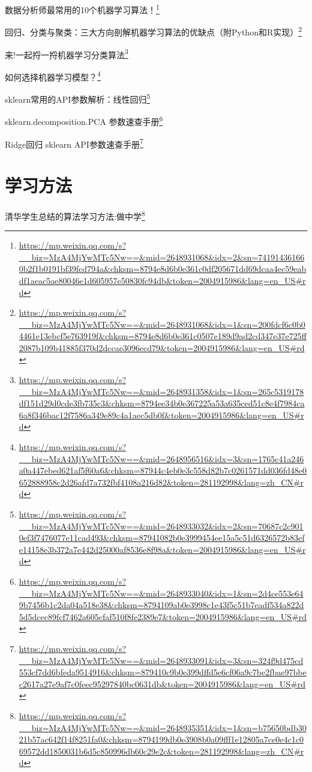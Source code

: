 \documentclass[]{ctexbook}
\renewcommand{\href}[2]{#2\footnote{\url{#1}}}
\begin{document}
\href{https://mp.weixin.qq.com/s?__biz=MzA4MjYwMTc5Nw==\&mid=2648931068\&idx=2\&sn=741914361660b2f1b0191bf39fcd794a\&chksm=8794e8d6b0e361c0df205671dd69dcaa4ec59eabdf1aeac5ae80046e1d605957e50830fc94db\&token=2004915986\&lang=en_US\#rd}{数据分析师最常用的10个机器学习算法！}

\href{https://mp.weixin.qq.com/s?__biz=MzA4MjYwMTc5Nw==\&mid=2648931068\&idx=1\&sn=200fdcf6c0b04461e13ebcf5e763919f\&chksm=8794e8d6b0e361c0507e189d9ad2cd347e37e725ff2087b109b41885f370d2dccae3096ecd79\&token=2004915986\&lang=en_US\#rd}{回归、分类与聚类：三大方向剖解机器学习算法的优缺点（附Python和R实现）}

\href{https://mp.weixin.qq.com/s?__biz=MzA4MjYwMTc5Nw==\&mid=2648931358\&idx=1\&sn=265c5319178df151d29d0cde3fb735c3\&chksm=8794ee34b0e367225a53a635ced51c8e4f7984ca6a8f346bac12f7586a349e89c4a1aec5db0f\&token=2004915986\&lang=en_US\#rd}{来!一起捋一捋机器学习分类算法}

\href{https://mp.weixin.qq.com/s?__biz=MzA4MjYwMTc5Nw==\&mid=2648956516\&idx=3\&sn=1765c41a246a0a447ebed621af5f60a6\&chksm=87944c4eb0e3c558d82b7c0261571dd036fd48e0652888958c2d26afd7a732fbf4108a216d82\&token=281192998\&lang=zh_CN\#rd}{如何选择机器学习模型？}

\href{https://mp.weixin.qq.com/s?__biz=MzA4MjYwMTc5Nw==\&mid=2648933032\&idx=2\&sn=70687c2c9010ef3f7476077e11cad493\&chksm=87941082b0e3999454ee15a5c51d6326572b83efe14158e3b372a7e442d25000af8536e8f98a\&token=2004915986\&lang=en_US\#rd}{sklearn常用的API参数解析：线性回归}

\href{https://mp.weixin.qq.com/s?__biz=MzA4MjYwMTc5Nw==\&mid=2648933040\&idx=1\&sn=2d4ce553e649b7456b1c2da04a518e38\&chksm=8794109ab0e3998c1e43f5c51b7eadf534a822d5d5dcec89fcf7462a605cfaf510f8fe2389e7\&token=2004915986\&lang=en_US\#rd}{sklearn.decomposition.PCA 参数速查手册}

\href{https://mp.weixin.qq.com/s?__biz=MzA4MjYwMTc5Nw==\&mid=2648933091\&idx=3\&sn=324f9d475cd553cf7dd6bfeda9514916\&chksm=879410c9b0e399dffd5e6cf06a9c7be2fbae97bbec2617a27e9af7c0feec95297840bc0631db\&token=2004915986\&lang=en_US\#rd}{Ridge回归 sklearn API参数速查手册}

\hypertarget{ux5b66ux4e60ux65b9ux6cd5}{%
\section{学习方法}\label{ux5b66ux4e60ux65b9ux6cd5}}

\href{https://mp.weixin.qq.com/s?__biz=MzA4MjYwMTc5Nw==\&mid=2648935351\&idx=1\&sn=b75650bdb3021b57ac642f14f8251fa0\&chksm=8794199db0e3908b0a09fff1e12805a7ce0e4c1c069572dd1850031b6d5c850996db60c29e2c\&token=281192998\&lang=zh_CN\#rd}{清华学生总结的算法学习方法:做中学}
\end{document}
